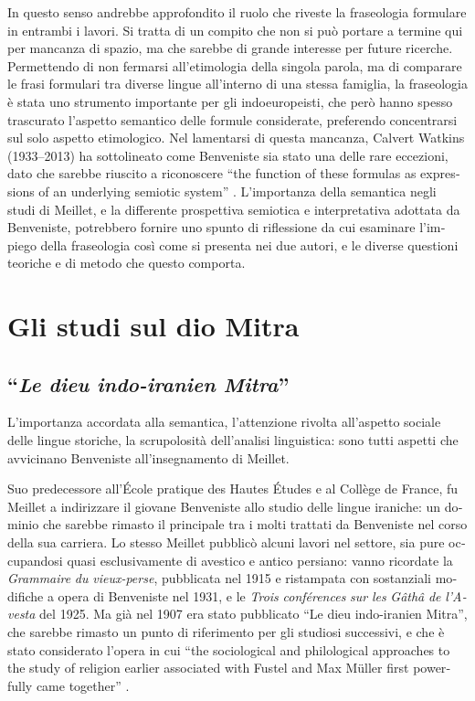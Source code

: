\documentclass[french,output=paper,colorlinks,citecolor=brown]{../langscibook}
\begin{document}
\begin{otherlanguage}{italian}
In questo senso andrebbe approfondito il ruolo che riveste la fraseologia formulare in entrambi i lavori. Si tratta di un compito che non si può portare a termine qui per mancanza di spazio, ma che sarebbe di grande interesse per future ricerche.
Permettendo di non fermarsi all’etimologia della singola parola, ma di comparare le frasi formulari tra diverse lingue all’interno di una stessa famiglia, la fraseologia è stata uno strumento importante per gli indoeuropeisti, che però hanno spesso trascurato l’aspetto semantico delle formule considerate, preferendo concentrarsi sul solo aspetto etimologico.  Nel lamentarsi di questa mancanza, Calvert Watkins (1933--2013) ha sottolineato come Benveniste sia stato una delle rare eccezioni, dato che sarebbe riuscito a riconoscere “the function of these formulas as expressions of an underlying semiotic system” \citep[43]{Watkins1995}. L’importanza della semantica negli studi di Meillet, e la differente prospettiva semiotica e interpretativa adottata da Benveniste, potrebbero fornire uno spunto di riflessione da cui esaminare l’impiego della fraseologia così come si presenta nei due autori, e le diverse questioni teoriche e di metodo che questo comporta.

\section{Gli studi sul dio Mitra}

\subsection{“\textit{Le dieu indo-iranien Mitra}”}

L’importanza accordata alla semantica, l’attenzione rivolta all’aspetto sociale delle lingue storiche, la scrupolosità dell’analisi linguistica: sono tutti aspetti che avvicinano Benveniste all’insegnamento di Meillet.

Suo predecessore all’École pratique des Hautes Études e al Collège de France, fu Meillet a indirizzare il giovane Benveniste allo studio delle lingue iraniche: un dominio che sarebbe rimasto il principale tra i molti trattati da Benveniste nel corso della sua carriera. Lo stesso Meillet pubblicò alcuni lavori nel settore, sia pure occupandosi quasi esclusivamente di avestico e antico persiano: vanno ricordate la \textit{Grammaire} \textit{du} \textit{vieux{}-perse}, pubblicata nel 1915 e ristampata con sostanziali modifiche a opera di Benveniste nel 1931, e le \textit{Trois} \textit{conférences} \textit{sur} \textit{les} \textit{Gâthâ} \textit{de} \textit{l’Avesta} del 1925. Ma già nel 1907 era stato pubblicato “Le dieu indo-iranien Mitra”, che sarebbe rimasto un punto di riferimento per gli studiosi successivi, e che è stato considerato l’opera in cui “the sociological and philological approaches to the study of religion earlier associated with Fustel and Max Müller first powerfully came together” \citep[13]{Lincoln2012}.


\end{otherlanguage}
\end{document}
